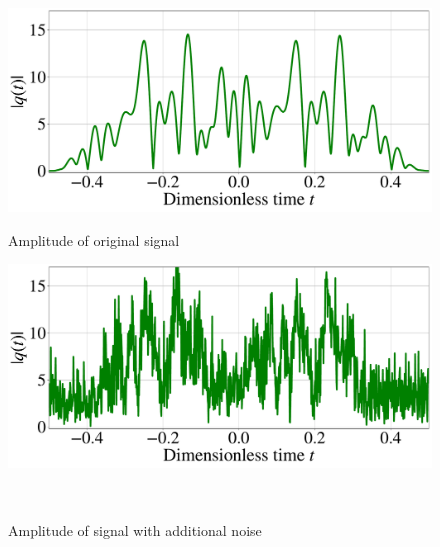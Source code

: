 \begin{figure}[htbp]
\centering
\begin{minipage}{.47\textwidth}
  \centering
  \includegraphics[width=1.\linewidth]{images/nn_nft/scirep_signal_example.pdf}
  \caption{Amplitude of original signal}
  \label{fig:won_signal}
\end{minipage}%
\hfill
\begin{minipage}{.47\textwidth}
  \centering
  \includegraphics[width=1.\linewidth]{images/nn_nft/scirep_signal_wn_example.pdf}
  \caption{Amplitude of signal with additional noise}
  \label{fig:wn_signal}
\end{minipage}
\\


\end{figure}

